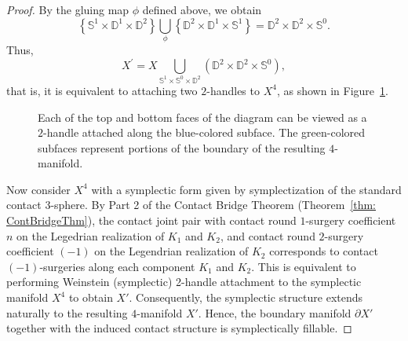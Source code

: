 \documentclass[10pt,a4paper]{amsart}
\newcommand{\D}{\mathbb{D}}
\newcommand{\dd}{\partial}
\newcommand{\s}{\mathbb{S}}
\begin{document}
\begin{proof}
By the gluing map $\phi$ defined above, we obtain
\[
\left\{ \s^{1} \times \D^{1} \times \D^{2} \right\} 
\bigcup_{\phi} 
\left\{ \D^{2} \times \D^{1} \times \s^{1} \right\} 
= \D^{2} \times \D^{2} \times \s^{0}.
\]
Thus,
\[
X^{\prime} = X \bigcup_{\s^{1} \times \s^{0} \times \D^{2}} 
\left( \D^{2} \times \D^{2} \times \s^{0} \right),
\]
that is, it is equivalent to attaching two $2$-handles to $X^{4}$, as shown in Figure~\ref{fig: RealizeAsTwo2-handles}.

\begin{figure}[ht]
    \centering
    
    \caption{Each of the top and bottom faces of the diagram can be viewed as a $2$-handle attached along the blue-colored subface. 
The green-colored subfaces represent portions of the boundary of the resulting $4$-manifold.}
    \label{fig: RealizeAsTwo2-handles}
\end{figure}

Now consider $X^{4}$ with a symplectic form given by symplectization of the standard contact 3-sphere. 
By Part 2 of the Contact Bridge Theorem (Theorem~\ref{thm: ContBridgeThm}), the contact joint pair with contact round $1$-surgery coefficient $n$ on the Legedrian 
realization of $K_1$ and $K_2$, and contact round $2$-surgery coefficient $(-1)$ on the Legendrian realization of $K_2$ corresponds to contact $(-1)$-surgeries along each component $K_1$ and $K_2$. This is equivalent to performing Weinstein (symplectic) 2-handle attachment to the symplectic manifold $X^{4}$ to obtain $X'$.
Consequently, the symplectic structure extends naturally to the resulting $4$-manifold $X'$. Hence, the boundary manifold $\dd X'$ together with the induced contact structure is symplectically fillable.
\end{proof}
\end{document}

